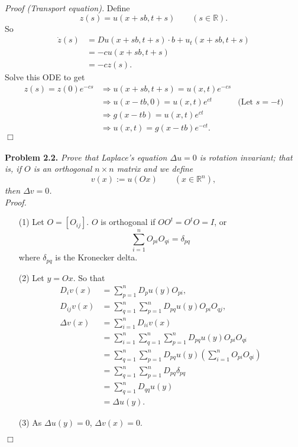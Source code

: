 \documentclass{article}
\begin{document}
\emph{Proof (Transport equation).}
Define
\[
  z(s) = u(x+sb,t+s) \qquad (s \in \mathbb{R}).
\]
So
\begin{align*}
  \dot{z}(s)
  &= Du(x+sb,t+s) \cdot b + u_t(x+sb,t+s) \\
  &= -cu(x+sb,t+s) \\
  &= -cz(s).
\end{align*}
Solve this ODE to get
\begin{align*}
  z(s) = z(0) e^{-cs}
  &\Longrightarrow
  u(x+sb,t+s) = u(x,t) e^{-cs} \\
  &\Longrightarrow
  u(x-tb,0) = u(x,t) e^{ct}
    &\text{(Let $s = -t$)} \\
  &\Longrightarrow
  g(x-tb) = u(x,t) e^{ct} \\
  &\Longrightarrow
  u(x,t) = g(x-tb) e^{-ct}.
\end{align*}
$\Box$ \\\\






\textbf{Problem 2.2.}
\emph{Prove that Laplace's equation $\Delta u = 0$ is rotation invariant;
that is, if $O$ is an orthogonal $n \times n$ matrix and we define
\[
  v(x) := u(Ox) \qquad (x \in \mathbb{R}^n),
\]
then $\Delta v = 0$.} \\

\emph{Proof.}
\begin{enumerate}
\item[(1)]
  Let $O = [O_{ij}]$.
  $O$ is orthogonal if $OO^{t} = O^{t}O = I$,
  or
  \[
    \sum_{i=1}^{n} O_{pi} O_{qi} = \delta_{pq}
  \]
  where $\delta_{pq}$ is the Kronecker delta.

\item[(2)]
  Let $y = Ox$.
  So that
  \begin{align*}
    D_i v(x)
    &= \sum_{p=1}^{n} D_p u(y) O_{pi}, \\
    D_{ij} v(x)
    &= \sum_{q=1}^{n} \sum_{p=1}^{n} D_{pq}u(y) O_{pi} O_{qj}, \\
    \Delta v(x)
    &= \sum_{i=1}^{n} D_{ii} v(x) \\
    &= \sum_{i=1}^{n} \sum_{q=1}^{n}\sum_{p=1}^{n} D_{pq}u(y) O_{pi} O_{qi} \\
    &= \sum_{q=1}^{n} \sum_{p=1}^{n} D_{pq} u(y) \left( \sum_{i=1}^{n} O_{pi} O_{qi} \right) \\
    &= \sum_{q=1}^{n} \sum_{p=1}^{n} D_{pq} \delta_{pq} \\
    &= \sum_{q=1}^{n} D_{qq}u(y) \\
    &= \Delta u(y).
  \end{align*}

\item[(3)]
  As $\Delta u(y) = 0$, $\Delta v(x) = 0$.
\end{enumerate}
$\Box$ \\\\
\end{document}
